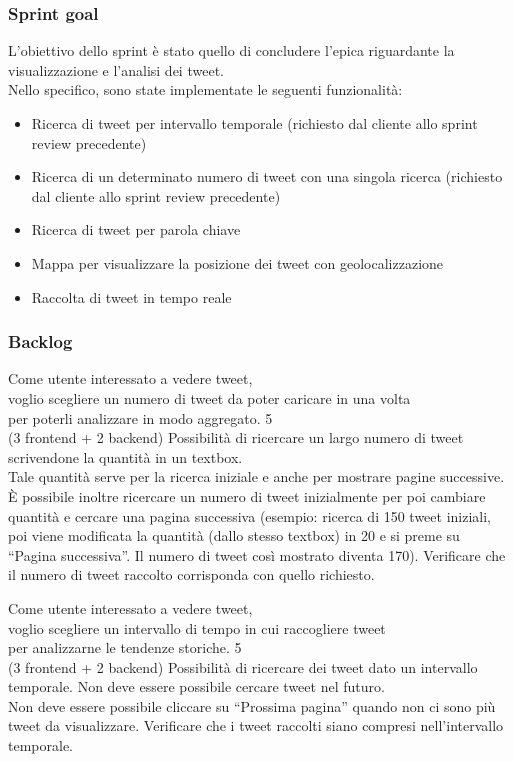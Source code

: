\subsubsection{Sprint goal}
L'obiettivo dello sprint è stato quello di concludere l'epica riguardante la visualizzazione e l'analisi dei tweet.\\
Nello specifico, sono state implementate le seguenti funzionalità:
\begin{itemize}
    \item Ricerca di tweet per intervallo temporale (richiesto dal cliente allo sprint review precedente)
    \item Ricerca di un determinato numero di tweet con una singola ricerca (richiesto dal cliente allo sprint review precedente)
    \item Ricerca di tweet per parola chiave
    \item Mappa per visualizzare la posizione dei tweet con geolocalizzazione
    \item Raccolta di tweet in tempo reale
\end{itemize}


\subsubsection{Backlog}
\userstory%
{Come utente interessato a vedere tweet,\\voglio scegliere un numero di tweet da poter caricare in una volta\\per poterli analizzare in modo aggregato.}%
{5\\(3 frontend + 2 backend)}%
{Possibilità di ricercare un largo numero di tweet scrivendone la quantità in un textbox.\\
Tale quantità serve per la ricerca iniziale e anche per mostrare pagine successive. 
È possibile inoltre ricercare un numero di tweet inizialmente per poi cambiare quantità e cercare una pagina successiva 
(esempio: ricerca di 150 tweet iniziali, poi viene modificata la quantità (dallo stesso textbox) in 20 e si preme su “Pagina successiva”. Il numero di tweet così mostrato diventa 170).}%
{Verificare che il numero di tweet raccolto corrisponda con quello richiesto.}

\userstory%
{Come utente interessato a vedere tweet,\\voglio scegliere un intervallo di tempo in cui raccogliere tweet\\per analizzarne le tendenze storiche.}%
{5\\(3 frontend + 2 backend)}%
{Possibilità di ricercare dei tweet dato un intervallo temporale. Non deve essere possibile cercare tweet nel futuro.\\
Non deve essere possibile cliccare su “Prossima pagina” quando non ci sono più tweet da visualizzare.}%
{Verificare che i tweet raccolti siano compresi nell'intervallo temporale.}

